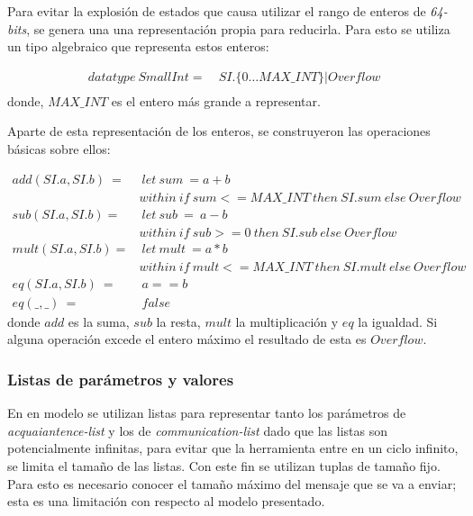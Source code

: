 Para evitar la explosión de estados que causa utilizar el rango de enteros de \textit{64-bits}, se genera una una representación propia para reducirla. Para esto se utiliza un tipo algebraico que representa estos enteros:

\begin{align*}
datatype\ SmallInt =&\ SI.\{0 \ldots MAX\_INT\} | Overflow \\
\end{align*}
donde, $MAX\_INT$ es el entero más grande a representar. 

Aparte de esta representación de los enteros, se construyeron las operaciones básicas sobre ellos:

\begin{align*}
add(SI.a, SI.b)\ =&\ let\ sum\ = a + b \\
&within\ if\ sum <= MAX\_INT\ then\ SI.sum\ else\ Overflow  \\
%
sub(SI.a, SI.b) =&\ let\ sub\ =\ a - b \\
& within\ if\ sub >= 0\ then\ SI.sub\ else\ Overflow \\
%
mult(SI.a, SI.b) =&\ let\ mult\ = a * b \\
& within\ if\ mult <= MAX\_INT\ then\ SI.mult\ else\ Overflow \\
eq(SI.a, SI.b)\ =&\ a == b \\
eq(\_, \_)\ =&\ false
\end{align*}
donde $add$ es la suma, $sub$ la resta, $mult$ la multiplicación y $eq$ la igualdad. Si alguna operación excede el entero máximo el resultado de esta es $Overflow$.

\subsubsection*{Listas de parámetros y valores}
En en modelo se utilizan listas para representar tanto los parámetros de \textit{acquaiantence-list} y los de \textit{communication-list} dado que las listas son potencialmente infinitas, para evitar que la herramienta entre en un ciclo infinito, se limita el tamaño de las listas. Con este fin se utilizan tuplas de tamaño fijo. Para esto es necesario conocer el tamaño máximo del mensaje que se va a enviar; esta es una limitación con respecto al modelo presentado.


